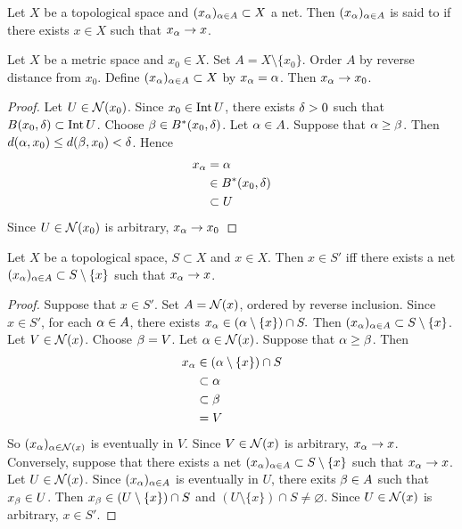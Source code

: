 \documentclass{book}
\begin{document}
	\begin{defn} 
	Let $X$ be a topological space and $(x_{\alpha})_{\alpha \in A} \subset X$ a net. Then $(x_{\alpha})_{\alpha \in A}$ is said to  if there exists $x \in X$ such that $x_{\alpha} \rightarrow x$. 
	\end{defn}	

	\begin{ex} 
		Let $X$ be a metric space and $x_0 \in X$. Set $A = X \setminus \{x_0\}$. Order $A$ by reverse distance from $x_0$. Define $(x_{\alpha})_{\alpha \in A} \subset X$ by $x_{\alpha} = \alpha$. Then $x_{\alpha} \rightarrow x_0$.
	\end{ex}

	\begin{proof}
		Let $U \in \mathcal{N}(x_0)$. Since $x_0 \in \operatorname{Int} U$, there exists $\delta > 0$ such that $B(x_0, \delta) \subset \operatorname{Int} U$. Choose $\beta \in B^*(x_0, \delta)$. Let $\alpha \in A$. Suppose that $\alpha \geq \beta$. Then $d(\alpha, x_0) \leq d(\beta, x_0) < \delta$. Hence  
		\begin{align*}
			x_{\alpha} 
			&= \alpha  \\
			& \in B^*(x_0, \delta) \\
			&\subset U
		\end{align*}
		Since $U \in \mathcal{N}(x_0)$ is arbitrary, $x_{\alpha} \rightarrow x_0 $
	\end{proof}
	
	\begin{ex} 
	Let $X$ be a topological space, $S \subset X$ and $x \in X$. Then $x \in S'$ iff there exists a net $(x_{\alpha})_{\alpha \in A} \subset S \setminus \{x\}$ such that $x_{\alpha} \rightarrow x$. 
	\end{ex}

	\begin{proof}
	Suppose that $x \in S'$. Set $A = \mathcal{N}(x)$, ordered by reverse inclusion.  Since $x \in S'$, for each $\alpha \in A$, there exists $x_\alpha \in (\alpha \setminus \{x\}) \cap S.$ Then $(x_{\alpha})_{\alpha \in A} \subset S \setminus \{x\}$. Let $V \in \mathcal{N}(x)$. Choose $\beta = V$. Let $\alpha \in \mathcal{N}(x)$. Suppose that $\alpha \geq \beta$. Then 
	\begin{align*}
	x_{\alpha} 
	&\in (\alpha \setminus \{x\}) \cap S \\
	& \subset \alpha \\
	& \subset \beta \\
	&= V
\end{align*}	
	So $(x_{\alpha})_{\alpha \in \mathcal{N}(x)}$ is eventually in $V$. Since $V \in \mathcal{N}(x)$ is arbitrary, $x_{\alpha } \rightarrow x$. \\
	Conversely, suppose that there exists a net $(x_{\alpha})_{\alpha \in A} \subset S \setminus \{x\}$ such that $x_{\alpha} \rightarrow x$. Let $U \in \mathcal{N}(x)$. Since $(x_{\alpha})_{\alpha \in A}$ is eventually in $U$, there exits $\beta \in A$ such that $x_{\beta} \in U$. Then $x_{\beta} \in (U \setminus \{x\}) \cap S$ and $(U \setminus \{x\}) \cap S \neq \varnothing$. Since $U \in \mathcal{N}(x)$ is arbitrary, $x \in S'$.
	\end{proof}
	
\end{document}
